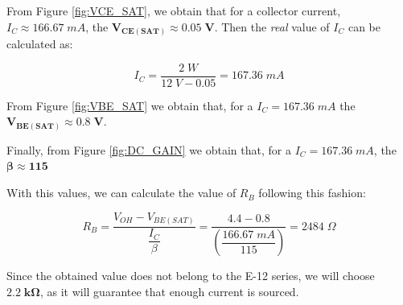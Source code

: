 From Figure \ref{fig:VCE_SAT}, we obtain that for a collector current, $I_C \approx 166.67 \; mA$, the $\bm{V_{CE(SAT)} \approx 0.05 \;V}$. Then the \textit{real} value of $I_C$ can be calculated as:

\begin{equation*}
    I_C = \frac{2 \; W}{12 \; V - 0.05} = 167.36 \; mA
\end{equation*}

\noindent From Figure \ref{fig:VBE_SAT} we obtain that, for a $I_C = 167.36 \; mA$ the $\bm{V_{BE(SAT)} \approx 0.8 \; V}$.\medskip

\noindent Finally, from Figure \ref{fig:DC_GAIN} we obtain that, for a $I_C = 167.36 \; mA$, the $\bm{\beta \approx 115}$ \medskip

\noindent With this values, we can calculate the value of $R_B$ following this fashion:

\begin{equation*}
    R_B = \frac{V_{OH} - V_{BE(SAT)}}{\dfrac{I_C}{\beta}} = \frac{4.4 - 0.8}{\left( \dfrac{166.67 \; mA}{115} \right)} = 2484 \; \Omega
\end{equation*}\medskip

Since the obtained value does not belong to the E-12 series, we will choose $\bm{2.2 \; k\Omega}$, as it will guarantee that enough current is sourced.

\clearpage



























